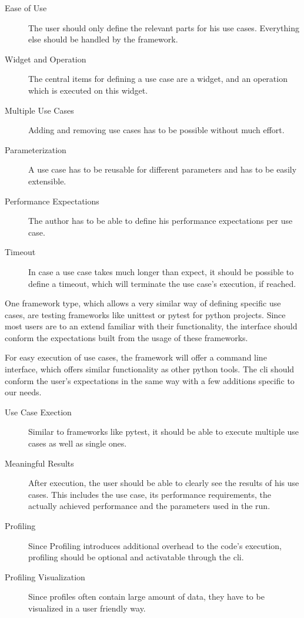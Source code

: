 \begin{description}
    \item[Ease of Use] 
        The user should only define the relevant parts for his use cases.
        Everything else should be handled by the framework.
    \item[Widget and Operation]
        The central items for defining a use case are a widget, and an operation
        which is executed on this widget.
    \item[Multiple Use Cases]
        Adding and removing use cases has to be possible without much effort.
    \item[Parameterization]
        A use case has to be reusable for different parameters and has to be
        easily extensible.
    \item[Performance Expectations]
        The author has to be able to define his performance expectations per use
        case.
    \item[Timeout]
        In case a use case takes much longer than expect, it should be possible
        to define a timeout, which will terminate the use case's execution, if
        reached.
\end{description}

One framework type, which allows a very similar way of defining specific use
cases, are testing frameworks like unittest or pytest for python projects. Since
most users are to an extend familiar with their functionality, the interface
should conform the expectations built from the usage of these frameworks.

For easy execution of use cases, the framework will offer a command line
interface, which offers similar functionality as other python tools. The
\gls{cli} should conform the user's expectations in the same way with a few
additions specific to our needs. 

\begin{description}
    \item[Use Case Exection]
        Similar to frameworks like pytest, it should be able to execute multiple
        use cases as well as single ones.
    \item[Meaningful Results]
        After execution, the user should be able to clearly see the results of
        his use cases. This includes the use case, its performance requirements,
        the actually achieved performance and the parameters used in the run.
    \item[Profiling]
        Since Profiling introduces additional overhead to the code's execution,
        profiling should be optional and activatable through the \gls{cli}.
    \item[Profiling Visualization]
        Since profiles often contain large amount of data, they have to be
        visualized in a user friendly way.
\end{description}


